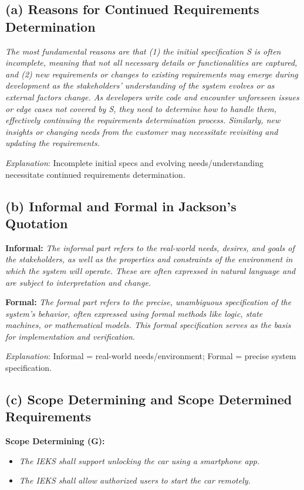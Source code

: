 \documentclass{article}
\begin{document}
\subsection*{(a) Reasons for Continued Requirements Determination}

\textit{The most fundamental reasons are that (1) the initial specification S is often incomplete, meaning that not all necessary details or functionalities are captured, and (2) new requirements or changes to existing requirements may emerge during development as the stakeholders' understanding of the system evolves or as external factors change. As developers write code and encounter unforeseen issues or edge cases not covered by S, they need to determine how to handle them, effectively continuing the requirements determination process. Similarly, new insights or changing needs from the customer may necessitate revisiting and updating the requirements.}

\textit{Explanation}: Incomplete initial specs and evolving needs/understanding necessitate continued requirements determination.

\subsection*{(b) Informal and Formal in Jackson's Quotation}

\textbf{Informal:} \textit{The informal part refers to the real-world needs, desires, and goals of the stakeholders, as well as the properties and constraints of the environment in which the system will operate. These are often expressed in natural language and are subject to interpretation and change.}

\textbf{Formal:} \textit{The formal part refers to the precise, unambiguous specification of the system's behavior, often expressed using formal methods like logic, state machines, or mathematical models. This formal specification serves as the basis for implementation and verification.}

\textit{Explanation}: Informal = real-world needs/environment; Formal = precise system specification.

\subsection*{(c) Scope Determining and Scope Determined Requirements}

\textbf{Scope Determining (G):}
\begin{itemize}
    \item \textit{The IEKS shall support unlocking the car using a smartphone app.}
    \item \textit{The IEKS shall allow authorized users to start the car remotely.}
\end{itemize}
\end{document}
